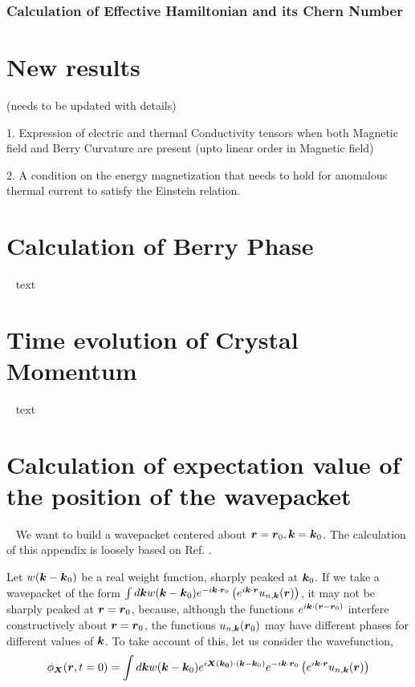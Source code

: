 \documentclass{report}
\renewcommand\vec[1]{\ensuremath\boldsymbol{#1}} %
\begin{document}
\subsection{Calculation of Effective Hamiltonian and its Chern Number}

\chapter{New results}
(needs to be updated with details)

1. Expression of electric and thermal Conductivity tensors when both Magnetic field and Berry Curvature are present (upto linear order in Magnetic field)

2. A condition on the energy magnetization that needs to hold for anomalous thermal current to satisfy the Einstein relation.

\appendix
\chapter{Calculation of Berry Phase}~\label{app:BerryPhase}
text
\chapter{Time evolution of Crystal Momentum}~\label{app:crystal-momentum-time-evolution}
text
\chapter{Calculation of expectation value of the position of the wavepacket}~\label{app:center-at-zero-time}
We want to build a wavepacket centered about $\vec{r}= \vec{r}_0, \vec{k}= \vec{k}_0$. The calculation of this appendix is loosely based on Ref. \cite{ralph2020berry}.


Let  $w(\vec{k} - \vec{k}_0)$ be a real weight function, sharply peaked at $\vec{k}_0$. If we take a wavepacket of the form $\int d\vec{k} w(\vec{k} - \vec{k}_0) e^{-i \vec{k} \cdot \vec{r}_0 } \left(e^{i \vec{k} \cdot\vec{r}} u_{n,\vec{k}}(\vec{r})\right)$, it may not be sharply peaked at $\vec{r} = \vec{r}_0$, because, although the functions $e^{i \vec{k} \cdot(\vec{r} - \vec{r}_0)}$ interfere constructively about $\vec{r} = \vec{r}_0$, the functions $u_{n,\vec{k}}(\vec{r}_0)$ may have different phases for different values of $\vec{k}$. To take account of this, let us consider the wavefunction, 
\begin{equation}\label{Eq:wavefunction-X}
	\phi_{\vec{X}}(\vec{r}, t=0) = \int d\vec{k} w(\vec{k} - \vec{k}_0) e^{i \vec{X}(\vec{k_0})\cdot (\vec{k} - \vec{k}_0)} e^{-i \vec{k} \cdot \vec{r}_0 } \left(e^{i \vec{k} \cdot\vec{r}} u_{n,\vec{k}}(\vec{r})\right)
\end{equation}
\end{document}
